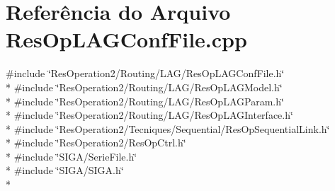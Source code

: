 \section{Referência do Arquivo Res\+Op\+L\+A\+G\+Conf\+File.\+cpp}
\label{_res_op_l_a_g_conf_file_8cpp}
{\ttfamily \#include \char`\"{}Res\+Operation2/\+Routing/\+L\+A\+G/\+Res\+Op\+L\+A\+G\+Conf\+File.\+h\char`\"{}}\\*
{\ttfamily \#include \char`\"{}Res\+Operation2/\+Routing/\+L\+A\+G/\+Res\+Op\+L\+A\+G\+Model.\+h\char`\"{}}\\*
{\ttfamily \#include \char`\"{}Res\+Operation2/\+Routing/\+L\+A\+G/\+Res\+Op\+L\+A\+G\+Param.\+h\char`\"{}}\\*
{\ttfamily \#include \char`\"{}Res\+Operation2/\+Routing/\+L\+A\+G/\+Res\+Op\+L\+A\+G\+Interface.\+h\char`\"{}}\\*
{\ttfamily \#include \char`\"{}Res\+Operation2/\+Tecniques/\+Sequential/\+Res\+Op\+Sequential\+Link.\+h\char`\"{}}\\*
{\ttfamily \#include \char`\"{}Res\+Operation2/\+Res\+Op\+Ctrl.\+h\char`\"{}}\\*
{\ttfamily \#include \char`\"{}S\+I\+G\+A/\+Serie\+File.\+h\char`\"{}}\\*
{\ttfamily \#include \char`\"{}S\+I\+G\+A/\+S\+I\+G\+A.\+h\char`\"{}}\\*
